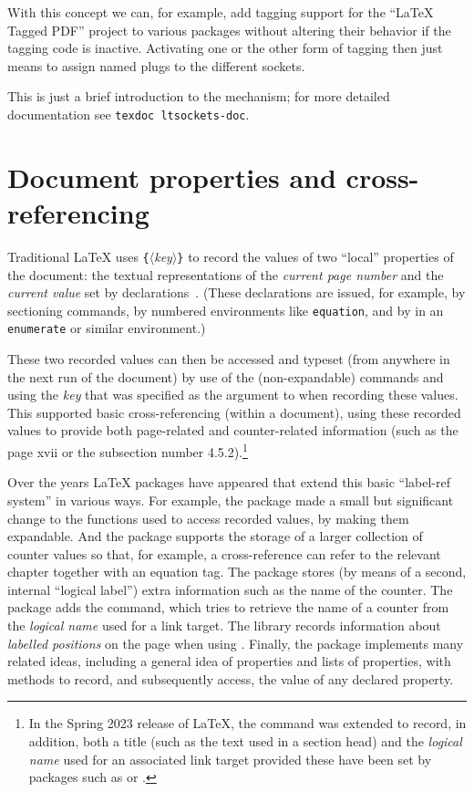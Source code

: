 \documentclass{ltnews}
\providecommand\meta[1]{$\langle$\textrm{\itshape#1}$\rangle$}
\providecommand\env[1]{\texttt{#1}}
\providecommand\Arg[1]{\texttt\{\meta{#1}\texttt\}}
\providecommand\env[1]{\texttt{#1}}
\let\finalpagebreak\pagebreak %
\begin{document}
With this concept we can, for example, add tagging support for the
\enquote{\LaTeX{} Tagged PDF} project to various packages without
altering their behavior if the tagging code is inactive. Activating
one or the other form of tagging then just means to assign named plugs
to the different sockets.

This is just a brief introduction to the mechanism; for more detailed
documentation see \texttt{texdoc ltsockets-doc}.


\finalpagebreak

\section{Document properties and cross-referencing}

Traditional \LaTeX{} uses \Arg{key} to record the values of two
\enquote{local} properties of the document: the textual
representations of the \emph{current page number} and the
\emph{current \textup{} value} set by 
declarations~\cite[p.~209]{38:Lamport}.  (These declarations are
issued, for example, by sectioning commands, by numbered environments
like \env{equation}, and by  in an \env{enumerate} or
similar environment.)

These two recorded values can then be accessed and typeset (from
anywhere in the next run of the document) by use of the
(non-expandable) commands  and  using the
\emph{key} that was specified as the argument to  when
recording these values.  This supported basic cross-referencing
(within a document), using these recorded values to provide both
page-related and counter-related information (such as the page xvii or
the subsection number 4.5.2).\footnote{In the Spring 2023 release of
\LaTeX{}, the  command was extended to record, in addition,
both a title (such as the text used in a section head) and the
\emph{logical name} used for an associated link target provided these
have been set by packages such as  or .}


Over the years \LaTeX{} packages have appeared that extend
this basic \enquote{label-ref system} in various ways.
%
For example, the  package made a small but significant change
to the functions used to access recorded values, by making them expandable.
And the  package supports the storage of a larger
collection of counter values so that, for example, a cross-reference
can refer to the relevant chapter together with an equation tag.
The  package stores (by means of a second, internal
\enquote{logical label}) extra information such as the name of the counter.
The  package adds the  command, which
tries to retrieve the name of a counter from the  \emph{logical name}
used for a link target.
The  library records information about
 \emph{labelled positions} on the page when using .
Finally, the  package implements many related ideas, including a general
idea of properties and lists of properties, with methods to record, and
subsequently access, the value of any declared property.
\end{document}
